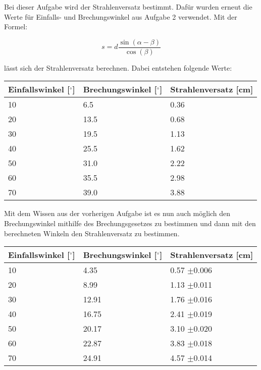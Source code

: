 Bei dieser Aufgabe wird der Strahlenversatz bestimmt. Dafür wurden erneut die Werte für Einfalls- und Brechungswinkel aus Aufgabe 2 verwendet. Mit der Formel:

\begin{displaymath}
    s = d\frac{\sin(\alpha-\beta)}{\cos(\beta)}
\end{displaymath}

\noindent lässt sich der Strahlenversatz berechnen. Dabei entstehen folgende Werte:

\begin{minipage}{\linewidth}
    \begin{table}[H]
        \centering
    \begin{tabular}{lll}
        \toprule
        Einfallswinkel [$^\circ$] & Brechungswinkel [$^\circ$] & Strahlenversatz [cm]  \\
        \midrule
        10 &  6.5 & 0.36 \\
        20 & 13.5 & 0.68 \\
        30 & 19.5 & 1.13 \\
        40 & 25.5 & 1.62 \\ 
        50 & 31.0 & 2.22 \\
        60 & 35.5 & 2.98 \\
        70 & 39.0 & 3.88 \\
        \bottomrule   
    \end{tabular}
    
    \label{tab:3}
\end{table}
\end{minipage}

\noindent Mit dem Wissen aus der vorherigen Aufgabe ist es nun auch möglich den Brechungswinkel mithilfe des Brechungsgesetzes zu bestimmen und dann mit den berechneten Winkeln den Strahlenversatz zu bestimmen.

\begin{minipage}{\linewidth}
    \begin{table}[H]
        \centering
    \begin{tabular}{lll}
        \toprule
        Einfallswinkel [$^\circ$] & Brechungswinkel [$^\circ$] & Strahlenversatz [cm]  \\
        \midrule
        10 &  4.35 & 0.57 $\pm$0.006 \\
        20 & 8.99 & 1.13 $\pm$0.011 \\
        30 & 12.91 & 1.76 $\pm$0.016 \\
        40 & 16.75 & 2.41 $\pm$0.019 \\ 
        50 & 20.17 & 3.10 $\pm$0.020 \\
        60 & 22.87 & 3.83 $\pm$0.018 \\
        70 & 24.91 & 4.57 $\pm$0.014 \\
        \bottomrule   
    \end{tabular}
    
    \label{tab:4}
\end{table}
\end{minipage}

